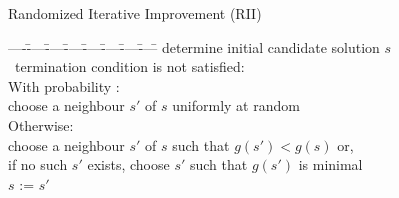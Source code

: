 % 
% 
% 
\begin{frame}[c]{Randomized Iterative Improvement (RII)}

\begin{tabbing}
----\=----\=----\=----\=----\=----\=----\=----\=\kill
\> determine initial candidate solution $s$\\
\> \pscWhile\ termination condition is not satisfied:\\
\> \vbar \> With probability :\\[-0.55ex]
\> \vbar \> \>  choose a neighbour $s'$ of $s$ uniformly at random\\[-0.55ex]
\> \vbar \> Otherwise:\\[-0.55ex]
\> \vbar \> \>  choose a neighbour $s'$ of $s$ such that $g(s') < g(s)$ or,\\[-0.55ex]
\> \vbar \> \>  \hspace*{0.4em} if no such $s'$ exists, 
                                                                choose $s'$ such that $g(s')$ is minimal\\[-0.55ex]
\> \vend \> $s$ := $s'$
\end{tabbing}

\pause


\end{frame}
